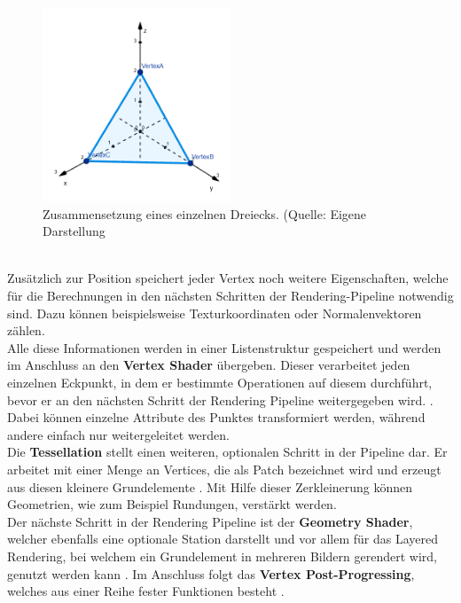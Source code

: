 \begin{figure}[h!]
\centering
\includegraphics[width=0.5\textwidth]{Abbildungen/triangle.png}
\caption[OpenGL Triangle]{Zusammensetzung eines einzelnen Dreiecks. (Quelle: Eigene Darstellung}
\label{fig:opengl-triangle}
\end{figure}\\
Zusätzlich zur Position speichert jeder Vertex noch weitere Eigenschaften, welche für die Berechnungen in den nächsten Schritten der Rendering-Pipeline notwendig sind. Dazu können beispielsweise Texturkoordinaten oder Normalenvektoren zählen. \\
Alle diese Informationen werden in einer Listenstruktur gespeichert und werden im Anschluss an den \textbf{Vertex Shader} übergeben. Dieser verarbeitet jeden einzelnen Eckpunkt, in dem er bestimmte Operationen auf diesem durchführt, bevor er an den nächsten Schritt der Rendering Pipeline weitergegeben wird. \citep{vries:learn-opengl-triangle}. Dabei können einzelne Attribute des Punktes transformiert werden, während andere einfach nur weitergeleitet werden.\\
Die \textbf{Tessellation} stellt einen weiteren, optionalen Schritt in der Pipeline dar. Er arbeitet mit einer Menge an Vertices, die als Patch bezeichnet wird und erzeugt aus diesen kleinere Grundelemente \citep{khronos:tessellation}. Mit Hilfe dieser Zerkleinerung können Geometrien, wie zum Beispiel Rundungen, verstärkt werden.\\
Der nächste Schritt in der Rendering Pipeline ist der \textbf{Geometry Shader}, welcher ebenfalls eine optionale Station darstellt und vor allem für das Layered Rendering, bei welchem ein Grundelement in mehreren Bildern gerendert wird, genutzt werden kann \citep{khronos:geometry-shader}. 
Im Anschluss folgt das \textbf{Vertex Post-Progressing}, welches aus einer Reihe fester Funktionen besteht \citep{khronos:rendering-pipeline}.
